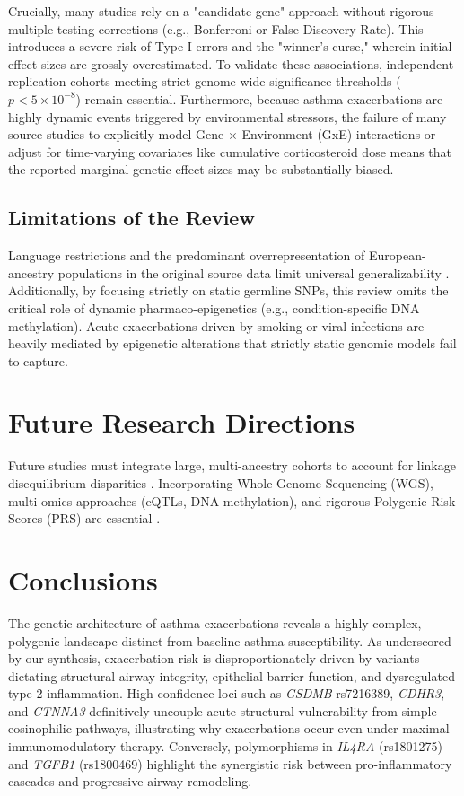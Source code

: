 \documentclass[11pt,a4paper]{article}
\begin{document}
Crucially, many studies rely on a "candidate gene" approach without rigorous multiple-testing corrections (e.g., Bonferroni or False Discovery Rate). This introduces a severe risk of Type I errors and the "winner's curse," wherein initial effect sizes are grossly overestimated. To validate these associations, independent replication cohorts meeting strict genome-wide significance thresholds ($p < 5 \times 10^{-8}$) remain essential. Furthermore, because asthma exacerbations are highly dynamic events triggered by environmental stressors, the failure of many source studies to explicitly model Gene $\times$ Environment (GxE) interactions or adjust for time-varying covariates like cumulative corticosteroid dose means that the reported marginal genetic effect sizes may be substantially biased.

\subsection{Limitations of the Review}
Language restrictions and the predominant overrepresentation of European-ancestry populations in the original source data limit universal generalizability \cite{HerreraLuisOrtega2022}. Additionally, by focusing strictly on static germline SNPs, this review omits the critical role of dynamic pharmaco-epigenetics (e.g., condition-specific DNA methylation). Acute exacerbations driven by smoking or viral infections are heavily mediated by epigenetic alterations that strictly static genomic models fail to capture.

\section{Future Research Directions}
Future studies must integrate large, multi-ancestry cohorts to account for linkage disequilibrium disparities \cite{HerreraLuisEspuelaOrtiz2020}. Incorporating Whole-Genome Sequencing (WGS), multi-omics approaches (eQTLs, DNA methylation), and rigorous Polygenic Risk Scores (PRS) are essential \cite{MartinGonzalezPerezGarcia2025, KimLim2023}.

\section{Conclusions}
The genetic architecture of asthma exacerbations reveals a highly complex, polygenic landscape distinct from baseline asthma susceptibility. As underscored by our synthesis, exacerbation risk is disproportionately driven by variants dictating structural airway integrity, epithelial barrier function, and dysregulated type 2 inflammation. High-confidence loci such as \textit{GSDMB} rs7216389, \textit{CDHR3}, and \textit{CTNNA3} definitively uncouple acute structural vulnerability from simple eosinophilic pathways, illustrating why exacerbations occur even under maximal immunomodulatory therapy. Conversely, polymorphisms in \textit{IL4RA} (rs1801275) and \textit{TGFB1} (rs1800469) highlight the synergistic risk between pro-inflammatory cascades and progressive airway remodeling.
\end{document}
